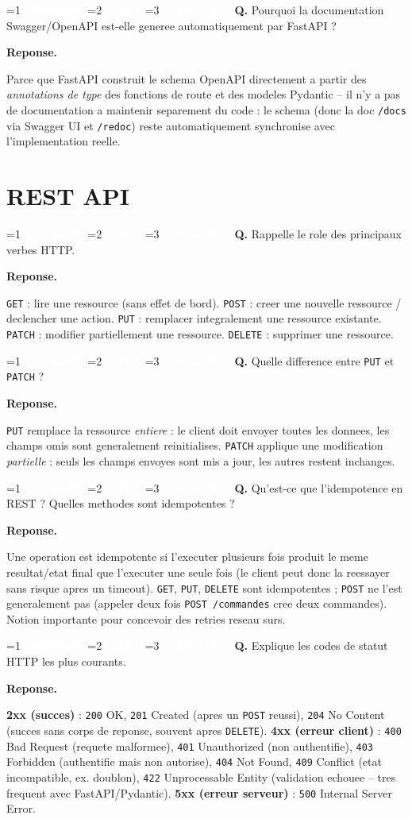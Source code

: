 \documentclass[11pt,a4paper]{article}
\newcommand{\badgeJ}{\textcolor{white}{\colorbox{junior}{\small\bfseries\ JUNIOR\ }}}
\newcommand{\badgeM}{\textcolor{white}{\colorbox{mid}{\small\bfseries\ MID\ }}}
\newcommand{\badgeS}{\textcolor{white}{\colorbox{senior}{\small\bfseries\ SENIOR\ }}}
\newcounter{qcount}
\newenvironment{qa}[2]{%
  \stepcounter{qcount}%
  \par\vspace{6pt}%
  \noindent\colorbox{qbg}{\parbox{\dimexpr\linewidth-12pt}{\vspace{2pt}%
  \ifnum#1=1 \badgeJ\fi\ifnum#1=2 \badgeM\fi\ifnum#1=3 \badgeS\fi
  \ \textbf{Q\theqcount.} #2\vspace{2pt}}}\par\vspace{4pt}%
  \noindent\textbf{\color{accent}Reponse.}\ \ignorespaces
}{%
  \par\vspace{8pt}%
}
\begin{document}
\begin{qa}{1}{Pourquoi la documentation Swagger/OpenAPI est-elle generee automatiquement par FastAPI ?}
Parce que FastAPI construit le schema OpenAPI directement a partir des
\emph{annotations de type} des fonctions de route et des modeles Pydantic --
il n'y a pas de documentation a maintenir separement du code : le schema
(donc la doc \texttt{/docs} via Swagger UI et \texttt{/redoc}) reste
automatiquement synchronise avec l'implementation reelle.
\end{qa}

\newpage
\section{REST API}

\begin{qa}{1}{Rappelle le role des principaux verbes HTTP.}
\texttt{GET} : lire une ressource (sans effet de bord). \texttt{POST} : creer
une nouvelle ressource / declencher une action. \texttt{PUT} : remplacer
integralement une ressource existante. \texttt{PATCH} : modifier partiellement
une ressource. \texttt{DELETE} : supprimer une ressource.
\end{qa}

\begin{qa}{1}{Quelle difference entre \texttt{PUT} et \texttt{PATCH} ?}
\texttt{PUT} remplace la ressource \emph{entiere} : le client doit envoyer
toutes les donnees, les champs omis sont generalement reinitialises.
\texttt{PATCH} applique une modification \emph{partielle} : seuls les champs
envoyes sont mis a jour, les autres restent inchanges.
\end{qa}

\begin{qa}{2}{Qu'est-ce que l'idempotence en REST ? Quelles methodes sont idempotentes ?}
Une operation est idempotente si l'executer plusieurs fois produit le meme
resultat/etat final que l'executer une seule fois (le client peut donc la
reessayer sans risque apres un timeout). \texttt{GET}, \texttt{PUT},
\texttt{DELETE} sont idempotentes ; \texttt{POST} ne l'est generalement pas
(appeler deux fois \texttt{POST /commandes} cree deux commandes). Notion
importante pour concevoir des retries reseau surs.
\end{qa}

\begin{qa}{1}{Explique les codes de statut HTTP les plus courants.}
\textbf{2xx (succes)} : \texttt{200} OK, \texttt{201} Created (apres un
\texttt{POST} reussi), \texttt{204} No Content (succes sans corps de reponse,
souvent apres \texttt{DELETE}). \textbf{4xx (erreur client)} : \texttt{400}
Bad Request (requete malformee), \texttt{401} Unauthorized (non authentifie),
\texttt{403} Forbidden (authentifie mais non autorise), \texttt{404} Not
Found, \texttt{409} Conflict (etat incompatible, ex. doublon), \texttt{422}
Unprocessable Entity (validation echouee -- tres frequent avec FastAPI/Pydantic).
\textbf{5xx (erreur serveur)} : \texttt{500} Internal Server Error.
\end{qa}
\end{document}
